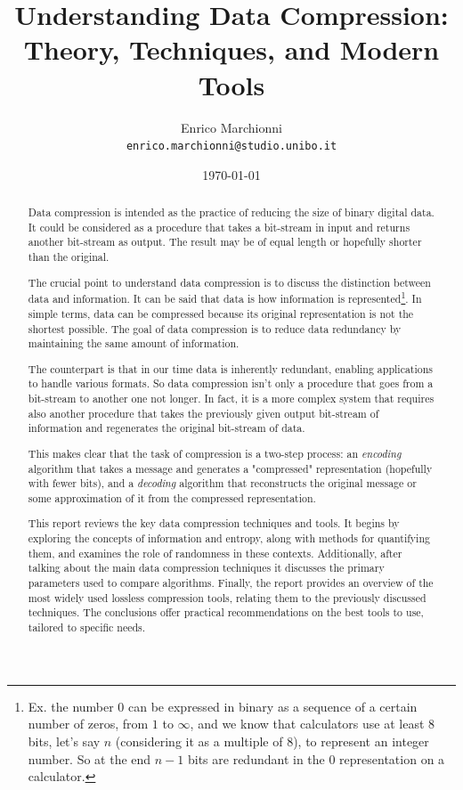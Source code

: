 \documentclass[12pt, a4paper]{report}
\title{
  Understanding Data Compression: Theory, Techniques, and Modern Tools
}
\author{
  Enrico Marchionni\\
  \texttt{enrico.marchionni@studio.unibo.it}
}
\date{\today}
\begin{document}
\maketitle

\begin{abstract}

Data compression is intended as the practice of reducing the size of binary digital data.
It could be considered as a procedure that takes a bit-stream in input and returns another bit-stream as output.
The result may be of equal length or hopefully shorter than the original.

The crucial point to understand data compression is to discuss the distinction between data and information.
It can be said that data is how information is represented\footnote{Ex. the number 0 can be expressed in binary as a sequence of a
certain number of zeros, from \(1\) to \(\infty\), and we know that calculators use at least 8 bits, let's say \(n\)
(considering it as a multiple of 8), to represent an integer number. So at the end \(n - 1\) bits are redundant in the 0
representation on a calculator.}.
In simple terms, data can be compressed because its original representation is not the shortest possible.
The goal of data compression is to reduce data redundancy by maintaining the same amount of information.

The counterpart is that in our time data is inherently redundant, enabling applications to handle various formats.
So data compression isn't only a procedure that goes from a bit-stream to another one not longer.
In fact, it is a more complex system that requires also another procedure that takes the previously given output bit-stream of
information and regenerates the original bit-stream of data.

This makes clear that the task of compression is a two-step process: an \textit{encoding} algorithm that takes a message
and generates a "compressed" representation (hopefully with fewer bits), and a \textit{decoding} algorithm that reconstructs
the original message or some approximation of it from the compressed representation.

This report reviews the key data compression techniques and tools.
It begins by exploring the concepts of information and entropy, along with methods for quantifying them, and examines the role of
randomness in these contexts.
Additionally, after talking about the main data compression techniques it discusses the primary parameters used to compare
algorithms.
Finally, the report provides an overview of the most widely used lossless compression tools, relating them to the previously
discussed techniques.
The conclusions offer practical recommendations on the best tools to use, tailored to specific needs.

\end{abstract}
\end{document}
